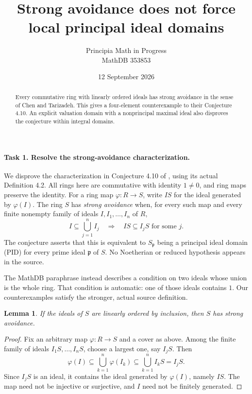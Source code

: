 \documentclass[11pt]{article}
\title{Strong avoidance does not force local principal ideal domains}
\author{Principia Math in Progress\\MathDB 353853}
\date{12 September 2026}
\newtheorem{lemma}{Lemma}
\begin{document}
\maketitle
\begin{abstract}
Every commutative ring with linearly ordered ideals has strong avoidance in the
sense of Chen and Tarizadeh. This gives a four-element counterexample to their
Conjecture 4.10. An explicit valuation domain with a nonprincipal maximal ideal
also disproves the conjecture within integral domains.
\end{abstract}

\paragraph{Task 1. Resolve the strong-avoidance characterization.}
We disprove the characterization in Conjecture 4.10 of \cite{CT}, using its
actual Definition 4.2. All rings here are commutative with identity $1\ne0$,
and ring maps preserve the identity. For a ring map $\varphi:R\to S$, write
$IS$ for the ideal generated by $\varphi(I)$. The ring $S$ has
\emph{strong avoidance} when, for every such map and every finite nonempty
family of ideals $I,I_1,\ldots,I_n$ of $R$,
\[
 I\subseteq\bigcup_{j=1}^n I_j
 \quad\Longrightarrow\quad
 IS\subseteq I_jS\text{ for some }j.
\]
The conjecture asserts that this is equivalent to $S_{\mathfrak p}$ being
a principal ideal domain (PID) for every prime ideal $\mathfrak p$ of $S$.
No Noetherian or reduced hypothesis appears in the source.

The MathDB paraphrase instead describes a condition on two ideals whose
union is the whole ring. That condition is automatic: one of those ideals
contains $1$. Our counterexamples satisfy the stronger, actual source definition.

\begin{lemma}\label{chain}
If the ideals of $S$ are linearly ordered by inclusion, then $S$ has strong
avoidance.
\end{lemma}
\begin{proof}
Fix an arbitrary map $\varphi:R\to S$ and a cover as above. Among the finite
family of ideals $I_1S,\ldots,I_nS$, choose a largest one, say $I_jS$. Then
\[
 \varphi(I)\subseteq\bigcup_{k=1}^n\varphi(I_k)
 \subseteq\bigcup_{k=1}^n I_kS=I_jS.
\]
Since $I_jS$ is an ideal, it contains the ideal generated by $\varphi(I)$,
namely $IS$. The map need not be injective or surjective, and $I$ need not
be finitely generated.
\end{proof}
\end{document}
